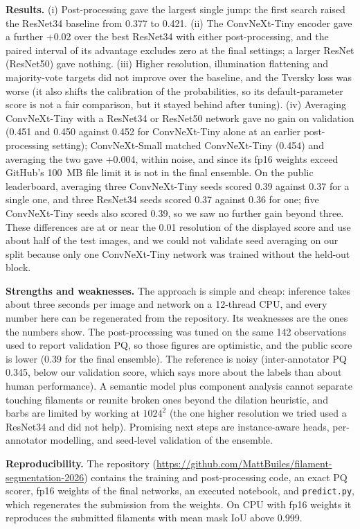 \textbf{Results.} (i) Post-processing gave the largest single jump: the first search raised the ResNet34 baseline from 0.377 to 0.421. (ii) The ConvNeXt-Tiny encoder gave a further +0.02 over the best ResNet34 with either post-processing, and the paired interval of its advantage excludes zero at the final settings; a larger ResNet (ResNet50) gave nothing. (iii) Higher resolution, illumination flattening and majority-vote targets did not improve over the baseline, and the Tversky loss was worse (it also shifts the calibration of the probabilities, so its default-parameter score is not a fair comparison, but it stayed behind after tuning). (iv) Averaging ConvNeXt-Tiny with a ResNet34 or ResNet50 network gave no gain on validation (0.451 and 0.450 against 0.452 for ConvNeXt-Tiny alone at an earlier post-processing setting); ConvNeXt-Small matched ConvNeXt-Tiny (0.454) and averaging the two gave +0.004, within noise, and since its fp16 weights exceed GitHub's 100~MB file limit it is not in the final ensemble. On the public leaderboard, averaging three ConvNeXt-Tiny seeds scored 0.39 against 0.37 for a single one, and three ResNet34 seeds scored 0.37 against 0.36 for one; five ConvNeXt-Tiny seeds also scored 0.39, so we saw no further gain beyond three. These differences are at or near the 0.01 resolution of the displayed score and use about half of the test images, and we could not validate seed averaging on our split because only one ConvNeXt-Tiny network was trained without the held-out block.

\textbf{Strengths and weaknesses.} The approach is simple and cheap: inference takes about three seconds per image and network on a 12-thread CPU, and every number here can be regenerated from the repository. Its weaknesses are the ones the numbers show. The post-processing was tuned on the same 142 observations used to report validation PQ, so those figures are optimistic, and the public score is lower (0.39 for the final ensemble). The reference is noisy (inter-annotator PQ 0.345, below our validation score, which says more about the labels than about human performance). A semantic model plus component analysis cannot separate touching filaments or reunite broken ones beyond the dilation heuristic, and barbs are limited by working at $1024^2$ (the one higher resolution we tried used a ResNet34 and did not help). Promising next steps are instance-aware heads, per-annotator modelling, and seed-level validation of the ensemble.

\textbf{Reproducibility.} The repository (\url{https://github.com/MattBuiles/filament-segmentation-2026}) contains the training and post-processing code, an exact PQ scorer, fp16 weights of the final networks, an executed notebook, and \texttt{predict.py}, which regenerates the submission from the weights. On CPU with fp16 weights it reproduces the submitted filaments with mean mask IoU above 0.999.
